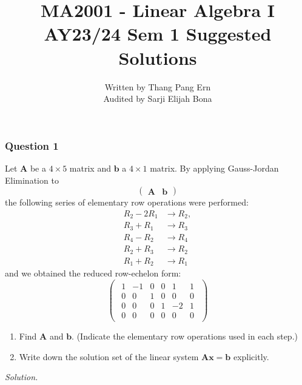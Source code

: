 \documentclass[12pt]{article}
\title{MA2001 - Linear Algebra I \\ AY23/24 Sem 1 Suggested Solutions}
\author{Written by Thang Pang Ern \\ Audited by Sarji Elijah Bona}
\begin{document}
\maketitle\subsubsection*{Question 1}
Let \( \mathbf{A} \) be a \( 4 \times 5 \) matrix and \( \mathbf{b} \) a \( 4 \times 1 \) matrix. By applying Gauss-Jordan Elimination to 
\[
\left(\begin{array}{c|c}
\mathbf{A} & \mathbf{b}
\end{array}\right)
\]
the following series of elementary row operations were performed:
\begin{align*}
  R_2 - 2R_1&\to R_2, \\
  R_3 + R_1 &\to R_3\\
  R_4 - R_2&\to R_4 \\
 R_2 + R_3 &\to R_2 \\
 R_1 + R_2 &\to R_1 
\end{align*}
and we obtained the reduced row-echelon form:
\[
\begin{pmatrix}
\begin{array}{ccccc|c}
1 & -1 & 0 & 0 & 1 & 1 \\
0 &  0 & 1 & 0 & 0 & 0 \\
0 &  0 & 0 & 1 & -2 & 1 \\
0 &  0 & 0 & 0 &  0 & 0
\end{array}
\end{pmatrix}
\]
\begin{enumerate}[label=\textbf{(\alph*)}]
\itemsep 0em
    \item Find \( \mathbf{A} \) and \( \mathbf{b} \). (Indicate the elementary row operations used in each step.) 
    \item Write down the solution set of the linear system \( \mathbf{Ax}=\mathbf{b} \) explicitly.
\end{enumerate} 
\newpage
\noindent \textit{Solution.}
\end{document}
